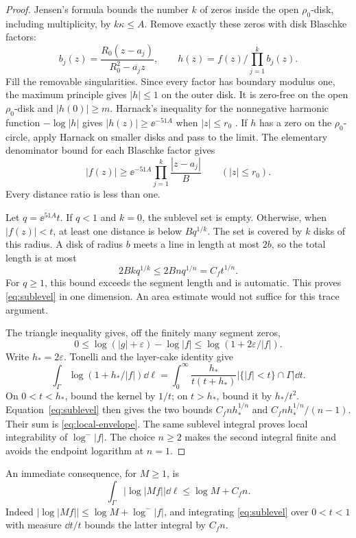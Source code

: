 \begin{proof}
Jensen's formula \cite{Tao2020LocalZeros} bounds the number \(k\)
of zeros inside the open \(\rho_0\)-disk, including multiplicity,
by \(k\kappa\le A\). Remove exactly these zeros with disk Blaschke
factors:
\[
 b_j(z)=\frac{R_0(z-a_j)}{R_0^2-\overline{a_j}z},\qquad
 h(z)=f(z)\Big/\prod_{j=1}^k b_j(z).
\]
Fill the removable singularities. Since every factor has boundary
modulus one, the maximum principle gives \(|h|\le1\) on the outer
disk. It is zero-free on the open \(\rho_0\)-disk and
\(|h(0)|\ge m\). Harnack's inequality for the nonnegative harmonic
function \(-\log|h|\) gives
\(|h(z)|\ge\ee^{-51A}\) when \(|z|\le r_0\)
\cite{Tao2016Harnack}. If \(h\) has a zero on the \(\rho_0\)-circle,
apply Harnack on smaller disks and pass to the limit.
The elementary denominator bound for each Blaschke factor gives
\begin{equation}\label{eq:factor-lower}
 |f(z)|\ge\ee^{-51A}
       \prod_{j=1}^k\frac{|z-a_j|}{B}\qquad(|z|\le r_0).
\end{equation}
Every distance ratio is less than one.

Let \(q=\ee^{51A}t\). If \(q<1\) and \(k=0\), the sublevel set
is empty. Otherwise, when \(|f(z)|<t\), at least one distance
is below \(Bq^{1/k}\). The set is covered by \(k\) disks of this
radius. A disk of radius \(b\) meets a line in length at most \(2b\),
so the total length is at most
\[
 2Bkq^{1/k}\le2Bnq^{1/n}=C_ft^{1/n}.
\]
For \(q\ge1\), this bound exceeds the segment length and is
automatic. This proves \eqref{eq:sublevel} in one dimension.
An area estimate would not suffice for this trace argument.

The triangle inequality gives, off the finitely many segment zeros,
\[
 0\le\log(|g|+\varepsilon)-\log|f|
 \le\log(1+2\varepsilon/|f|).
\]
Write \(h_*=2\varepsilon\). Tonelli and the layer-cake identity give
\[
 \int_\Gamma\log(1+h_*/|f|)\dd\ell
 =\int_0^\infty
 \frac{h_*}{t(t+h_*)}|\{|f|<t\}\cap\Gamma|\dd t.
\]
On \(0<t<h_*\), bound the kernel by \(1/t\); on \(t>h_*\),
bound it by \(h_*/t^2\). Equation~\eqref{eq:sublevel} then gives
the two bounds \(C_fn h_*^{1/n}\) and
\(C_fn h_*^{1/n}/(n-1)\). Their sum is
\eqref{eq:local-envelope}. The same sublevel integral proves local
integrability of \(\log^-|f|\). The choice \(n\ge2\) makes the
second integral finite and avoids the endpoint logarithm at \(n=1\).
\end{proof}

An immediate consequence, for \(M\ge1\), is
\begin{equation}\label{eq:absolute-log-local}
 \int_\Gamma|\log|Mf||\dd\ell\le\log M+C_fn.
\end{equation}
Indeed \(|\log|Mf||\le\log M+\log^-|f|\), and integrating
\eqref{eq:sublevel} over \(0<t<1\) with measure \(\dd t/t\)
bounds the latter integral by \(C_fn\).

